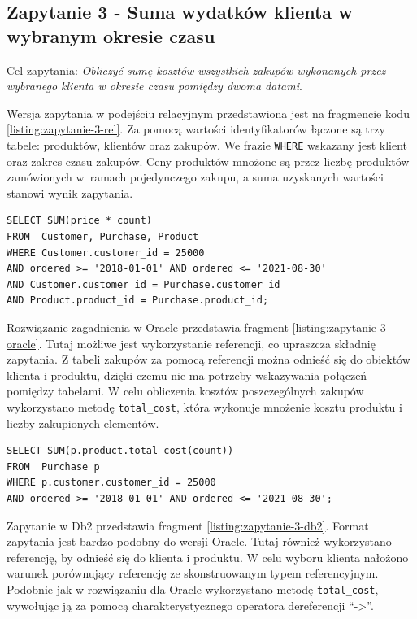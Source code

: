 \documentclass[a4paper,twoside,12pt]{book}
\begin{document}
\subsection{Zapytanie 3 - Suma wydatków klienta w wybranym okresie czasu}

Cel zapytania: \textit{Obliczyć sumę kosztów wszystkich zakupów wykonanych przez wybranego klienta w okresie czasu pomiędzy dwoma datami}.

Wersja zapytania w podejściu relacyjnym przedstawiona jest na fragmencie kodu \ref{listing:zapytanie-3-rel}. Za pomocą wartości identyfikatorów łączone są trzy tabele: produktów, klientów oraz zakupów. We frazie \lstinline{WHERE} wskazany jest klient oraz zakres czasu zakupów. Ceny produktów mnożone są przez liczbę produktów zamówionych w~ramach pojedynczego zakupu, a suma uzyskanych wartości stanowi wynik zapytania. 

\begin{lstlisting}[style=SQL, caption={Zapytanie trzecie w podejściu relacyjnym.}, label={listing:zapytanie-3-rel}, captionpos=b]
SELECT SUM(price * count)
FROM  Customer, Purchase, Product
WHERE Customer.customer_id = 25000
AND ordered >= '2018-01-01' AND ordered <= '2021-08-30'
AND Customer.customer_id = Purchase.customer_id
AND Product.product_id = Purchase.product_id;
\end{lstlisting}

Rozwiązanie zagadnienia w Oracle przedstawia fragment \ref{listing:zapytanie-3-oracle}. Tutaj możliwe jest wykorzystanie referencji, co upraszcza składnię zapytania. Z tabeli zakupów za pomocą referencji można odnieść się do obiektów klienta i produktu, dzięki czemu nie ma potrzeby wskazywania połączeń pomiędzy tabelami. W celu obliczenia kosztów poszczególnych zakupów wykorzystano metodę \lstinline{total_cost}, która wykonuje mnożenie kosztu produktu i liczby zakupionych elementów.

\begin{lstlisting}[style=SQL, caption={Zapytanie trzecie w Oracle.}, label={listing:zapytanie-3-oracle}, captionpos=b]
SELECT SUM(p.product.total_cost(count))
FROM  Purchase p
WHERE p.customer.customer_id = 25000
AND ordered >= '2018-01-01' AND ordered <= '2021-08-30';
\end{lstlisting}

Zapytanie w Db2 przedstawia fragment \ref{listing:zapytanie-3-db2}. Format zapytania jest bardzo podobny do wersji Oracle. Tutaj również wykorzystano referencję, by odnieść się do klienta i produktu. W celu wyboru klienta nałożono warunek porównujący referencję ze skonstruowanym typem referencyjnym. Podobnie jak w rozwiązaniu dla Oracle wykorzystano metodę \lstinline{total_cost}, wywołując ją za pomocą charakterystycznego operatora dereferencji ``->''.
\end{document}
